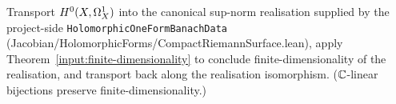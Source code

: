 \begin{proofsketch}
Transport \(H^{0}(X,\Omega^{1}_{X})\) into the canonical sup-norm realisation supplied by
the project-side \texttt{HolomorphicOneFormBanachData}
(Jacobian/HolomorphicForms/CompactRiemannSurface.lean), apply
Theorem~\ref{input:finite-dimensionality} to conclude
finite-dimensionality of the realisation, and transport back along
the realisation isomorphism. (\(\mathbb{C}\)-linear bijections preserve
finite-dimensionality.)
\end{proofsketch}
